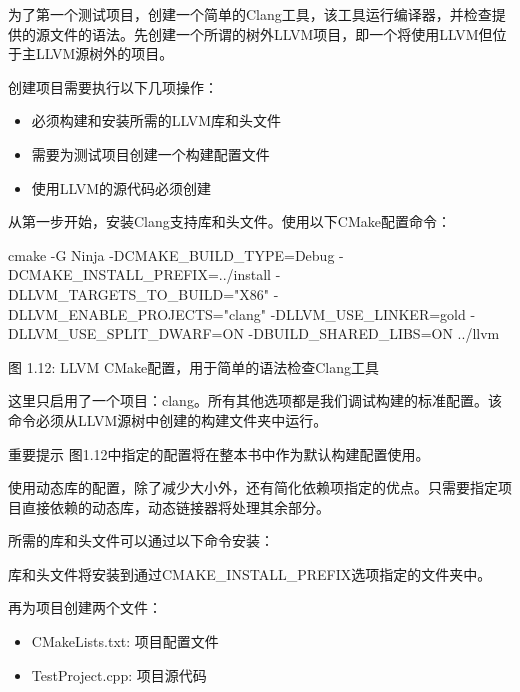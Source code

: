 为了第一个测试项目，创建一个简单的Clang工具，该工具运行编译器，并检查提供的源文件的语法。先创建一个所谓的树外LLVM项目，即一个将使用LLVM但位于主LLVM源树外的项目。

创建项目需要执行以下几项操作：

\begin{itemize}
\item
必须构建和安装所需的LLVM库和头文件

\item
需要为测试项目创建一个构建配置文件

\item
使用LLVM的源代码必须创建
\end{itemize}

从第一步开始，安装Clang支持库和头文件。使用以下CMake配置命令：

\begin{shell}
cmake -G Ninja -DCMAKE_BUILD_TYPE=Debug -DCMAKE_INSTALL_PREFIX=../install -DLLVM_TARGETS_TO_BUILD="X86" -DLLVM_ENABLE_PROJECTS="clang" -DLLVM_USE_LINKER=gold -DLLVM_USE_SPLIT_DWARF=ON -DBUILD_SHARED_LIBS=ON ../llvm
\end{shell}

\begin{center}
图 1.12: LLVM CMake配置，用于简单的语法检查Clang工具
\end{center}

这里只启用了一个项目：clang。所有其他选项都是我们调试构建的标准配置。该命令必须从LLVM源树中创建的构建文件夹中运行。

\begin{myNotic}{重要提示}
图1.12中指定的配置将在整本书中作为默认构建配置使用。
\end{myNotic}

使用动态库的配置，除了减少大小外，还有简化依赖项指定的优点。只需要指定项目直接依赖的动态库，动态链接器将处理其余部分。

所需的库和头文件可以通过以下命令安装：


库和头文件将安装到通过CMAKE\_INSTALL\_PREFIX选项指定的文件夹中。

再为项目创建两个文件：

\begin{itemize}
\item
CMakeLists.txt: 项目配置文件

\item
TestProject.cpp: 项目源代码
\end{itemize}

